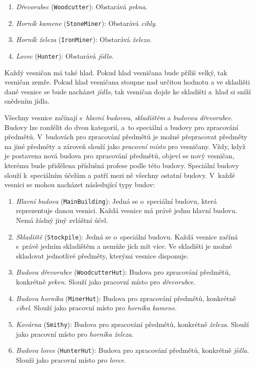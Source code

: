 \begin{enumerate}
    \item \textit{Dřevorubec} (\verb|Woodcutter|): Obstarává \textit{prkna}.
    \item \textit{Horník kamene} (\verb|StoneMiner|): Obstarává \textit{cihly}.
    \item \textit{Horník železa} (\verb|IronMiner|): Obstarává \textit{železo}.
    \item \textit{Lovec} (\verb|Hunter|): Obstarává \textit{jídlo}.
\end{enumerate}

Každý vesničan má také hlad. Pokud hlad vesničana bude příliš velký, tak vesničan zemře. Pokud hlad vesničana stoupne nad určitou hodnotu a ve skladišti dané vesnice se bude nacházet \textit{jídlo}, tak vesničan dojde ke skladišti a~hlad si sníží snědením jídla.

Všechny vesnice začínají s~\textit{hlavní budovou}, \textit{skladištěm} a \textit{budovou dřevorubce}. Budovy lze rozdělit do dvou kategorií, a~to speciální a budovy pro zpracování předmětů. V~budovách pro zpracování předmětů je možné přepracovat předměty na jiné předměty a zároveň slouží jako \textit{pracovní místo} pro vesničany. Vždy, když je postavena nová budova pro zpracování předmětů, objeví se nový vesničan, kterému bude přidělena příslušná profese podle této budovy. Speciální budovy slouží k~speciálním účelům a patří mezi ně všechny ostatní budovy. V~každé vesnici se mohou nacházet následující typy budov:

\begin{enumerate}
    \item \textit{Hlavní budova} (\verb|MainBuilding|): Jedná se o~speciální budovu, která reprezentuje danou vesnici. Každá vesnice má právě jednu hlavní budovu. Nemá žádný jiný zvláštní účel.
    \item \textit{Skladiště} (\verb|Stockpile|): Jedná se o~speciální budovu. Každá vesnice začíná s~právě jedním skladištěm a nemůže jich mít více. Ve skladišti je možné skladovat jednotlivé předměty, kterými vesnice disponuje.
    \item \textit{Budova dřevorubce} (\verb|WoodcutterHut|): Budova pro zpracování předmětů, konkrétně \textit{prken}. Slouží jako pracovní místo pro \textit{dřevorubce}.
    \item \textit{Budova horníka} (\verb|MinerHut|): Budova pro zpracování předmětů, konkrétně \textit{cihel}. Slouží jako pracovní místo pro \textit{horníka kamene}.
    \item \textit{Kovárna} (\verb|Smithy|): Budova pro zpracování předmětů, konkrétně \textit{železa}. Slouží jako pracovní místo pro \textit{horníka železa}.
    \item \textit{Budova lovce} (\verb|HunterHut|): Budova pro zpracování předmětů, konkrétně \textit{jídla}. Slouží jako pracovní místo pro \textit{lovce}.
\end{enumerate}
